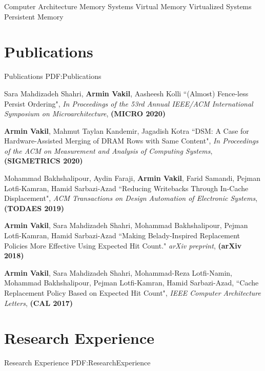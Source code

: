 \documentclass[a4paper,9pt,oneside]{article}
\begin{document}
\begin{body}
\BulletItem
Computer Architecture
\BulletItem
Memory Systems
\BulletItem
Virtual Memory
\BulletItem
Virtualized Systems
\BulletItem
Persistent Memory

\section
{Publications}
{Publications}
{PDF:Publications}

\BulletItem
Sara Mahdizadeh Shahri,
\textbf{Armin Vakil},
Aasheesh Kolli
``(Almost) Fence-less Persist Ordering", \textit{In Proceedings of the 53rd Annual IEEE/ACM International Symposium on Microarchitecture}, \textbf{(MICRO 2020)}

\BulletItem
\textbf{Armin Vakil},
Mahmut Taylan Kandemir,
Jagadish Kotra
``DSM: A Case for Hardware-Assisted Merging of DRAM Rows with Same Content", \textit{In Proceedings of the ACM on Measurement and Analysis of Computing Systems}, \textbf{(SIGMETRICS 2020)}

\BulletItem
Mohammad Bakhshalipour,
Aydin Faraji,
\textbf{Armin Vakil},
Farid Samandi,
Pejman Lotfi-Kamran,
Hamid Sarbazi-Azad
``Reducing Writebacks Through In-Cache Displacement", \textit{ACM Transactions on Design Automation of Electronic Systems}, \textbf{(TODAES 2019)}

\BulletItem
\textbf{Armin Vakil},
Sara Mahdizadeh Shahri,
Mohammad Bakhshalipour,
Pejman Lotfi-Kamran,
Hamid Sarbazi-Azad
``Making Belady-Inspired Replacement Policies More Effective Using Expected Hit Count." \textit{arXiv preprint}, \textbf{(arXiv 2018)}


\BulletItem
\textbf{Armin Vakil},
Sara Mahdizadeh Shahri,
Mohammad-Reza Lotfi-Namin,
Mohammad Bakhshalipour,
Pejman Lotfi-Kamran,
Hamid Sarbazi-Azad,
``Cache Replacement Policy Based on Expected Hit Count", \textit{IEEE Computer Architecture Letters}, \textbf{(CAL 2017)}



\section
{Research Experience}
{Research Experience}
{PDF:ResearchExperience}


\end{body}
\end{document}
